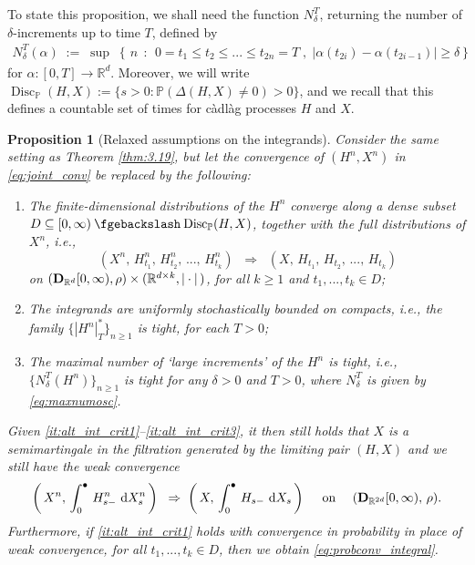 \documentclass[11pt]{article}
\newtheorem{prop}[theorem]{Proposition}
\theoremstyle{definition}\newtheorem{example}[theorem]{Example}
\theoremstyle{definition}\newtheorem{counterexample}[theorem]{Counterexample}
\theoremstyle{definition}\newtheorem{remark}[theorem]{Remark}
\theoremstyle{definition}\newtheorem{defi}[theorem]{Definition}
\numberwithin{equation}{section}
\newcommand{\R}{\mathbb{R}}
\newcommand{\D}{{\bf D}}											%
\newcommand*\diff{\mathop{}\!\mathrm{d}}								%
\newcommand{\Pro}{\mathbb{P}}										%
\renewcommand{\sup}[1]{\underset{#1}{\operatorname{sup}}\;}					%
\renewcommand{\setminus}{\mathbin{\fgebackslash}}						%
\renewcommand{\|}{\; : \, \;}											%
\begin{document}
To state this proposition, we shall need the function $N^T_\delta$, returning the number of $\delta$-increments up to time $T$, defined by 
\begin{align} N^T_\delta(\alpha) \; := \;   \sup{} \left\{ \, n \;\,  : \, \; 0=t_1\le t_2 \le ...\le t_{2n}=T \; , \;  |\alpha(t_{2i})-\alpha(t_{2i-1})|\ge \delta \right\} \label{eq:maxnumosc} \end{align}
for $\alpha:[0,T] \to \R^d$.
Moreover, we will write $\operatorname{Disc}_\Pro(H,X):=\{s>0: \Pro(\Delta(H,X)\neq 0)>0\}$, and we recall that this defines a countable set of times for c\`adl\`ag processes $H$ and $X$.



\begin{prop}[Relaxed assumptions on the integrands]\label{remark:weaker_integrnd_conv} Consider the same setting as Theorem \ref{thm:3.19}, but let the convergence of $(H^n,X^n)$ in \eqref{eq:joint_conv} be replaced by the following:
	\begin{enumerate}
		\renewcommand{\theenumi}{F\arabic{enumi}}
		\item  \label{it:alt_int_crit1} The finite-dimensional distributions of the $H^n$ converge along a dense subset $D \subseteq [0,\infty) \setminus \operatorname{Disc}_\Pro(H,X)$, together with the full distributions of $X^n$, i.e., 
		\[
		(X^n, \, H^n_{t_1}, \, H^n_{t_2},\, ...,\, H^n_{t_k}) \; \;  \Rightarrow \; \;  (X, \, H_{t_1}, \, H_{t_2},\, ...,\, H_{t_k})
		\]
		on $(\D_{\R^d}[0, \infty), \rho) \times (\R^{d\times k}, |\cdot|\, )$,	for all $k\ge 1$ and $t_1,...,t_k \in D$;
		\item \label{it:alt_int_crit2} The integrands are uniformly stochastically bounded on compacts, i.e., the family $\{|H^n|^*_T\}_{n \ge 1}$ is tight, for each $T>0$;
		\item \label{it:alt_int_crit3} The maximal number of `large increments' of the $H^n$ is tight, i.e., $\{N^T_\delta(H^n)\}_{n\ge 1}$ is tight for any $\delta>0$ and $T>0$, where $N^T_\delta$ is given by \eqref{eq:maxnumosc}.
	\end{enumerate}
	Given \eqref{it:alt_int_crit1}--\eqref{it:alt_int_crit3}, it then still holds that $X$ is a semimartingale in the filtration generated by the limiting pair $(H,X)$ and we still have the weak convergence
	\begin{equation}\label{eq:relaxed_integrands_conv}
		\left( \, X^n, \, \int_0^\bullet \, H^n_{s-} \, \diff X_s^n\, \right) \;  \; \Rightarrow \; \left( \, X, \, \int_0^\bullet \, H_{s-} \, \diff X_s\, \right) \quad \text{ on } \quad (\D_{\R^{2d}}[0,\infty), \, \rho).
	\end{equation}
	Furthermore, if \eqref{it:alt_int_crit1} holds with convergence in probability in place of weak convergence, for all $t_1,...,t_k \in D$, then we obtain \eqref{eq:probconv_integral}.
\end{prop}
\end{document}
